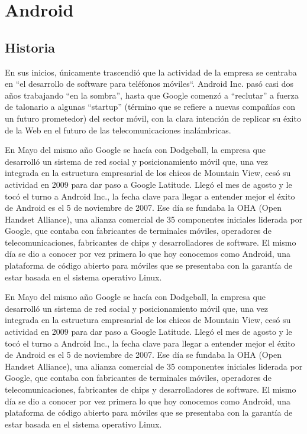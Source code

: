 \documentclass{bmcart}
\begin{document}
\section*{Android}

\subsection*{Historia}
En sus inicios, únicamente trascendió que la actividad de la empresa se
centraba en “el desarrollo de software para teléfonos móviles“.\newline
Android Inc. pasó casi dos años trabajando “en la sombra”, hasta que Google comenzó
a “reclutar” a fuerza de talonario a algunas “startup” (término que se refiere a nuevas
compañías con un futuro prometedor) del sector móvil, con la clara intención de replicar su
éxito de la Web en el futuro de las telecomunicaciones inalámbricas.

En Mayo del mismo año Google se hacía con Dodgeball, la empresa que desarrolló un
sistema de red social y posicionamiento móvil que, una vez integrada en la estructura
empresarial de los chicos de Mountain View, cesó su actividad en 2009 para dar paso a Google
Latitude. Llegó el mes de agosto y le tocó el turno a Android Inc., la fecha clave para llegar a
entender mejor el éxito de Android es el 5 de noviembre de 2007. Ese día se fundaba la OHA
(Open Handset Alliance), una alianza comercial de 35 componentes iniciales liderada por
Google, que contaba con fabricantes de terminales móviles, operadores de
telecomunicaciones, fabricantes de chips y desarrolladores de software. El mismo día se dio a
conocer por vez primera lo que hoy conocemos como Android, una plataforma de código
abierto para móviles que se presentaba con la garantía de estar basada en el sistema operativo
Linux. 

En Mayo del mismo año Google se hacía con Dodgeball, la empresa que desarrolló un
sistema de red social y posicionamiento móvil que, una vez integrada en la estructura
empresarial de los chicos de Mountain View, cesó su actividad en 2009 para dar paso a Google
Latitude. Llegó el mes de agosto y le tocó el turno a Android Inc., la fecha clave para llegar a
entender mejor el éxito de Android es el 5 de noviembre de 2007. Ese día se fundaba la OHA
(Open Handset Alliance), una alianza comercial de 35 componentes iniciales liderada por
Google, que contaba con fabricantes de terminales móviles, operadores de
telecomunicaciones, fabricantes de chips y desarrolladores de software. El mismo día se dio a
conocer por vez primera lo que hoy conocemos como Android, una plataforma de código
abierto para móviles que se presentaba con la garantía de estar basada en el sistema operativo
Linux. \cite{herraiz2012android}\cite{baez1997introduccion}\cite{benbourahala2013android}\newline
\end{document}
